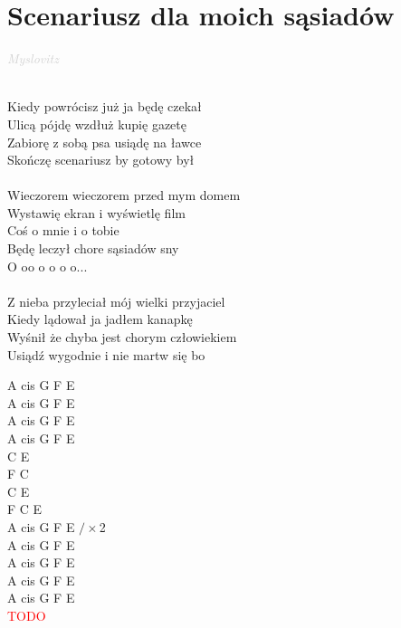 \documentclass[a5paper, 10pt]{book}
\begin{document}
\section{Scenariusz dla moich sąsiadów}\textcolor{lightgray}{\textit{Myslovitz}}\\~\\
\begin{minipage}[t]{0.8\textwidth}
  Kiedy powrócisz już ja będę czekał\\
  Ulicą pójdę wzdłuż kupię gazetę\\
  Zabiorę z sobą psa usiądę na ławce\\
  Skończę scenariusz by gotowy był\\
  \\
  \hspace*{5mm}Wieczorem wieczorem przed mym domem\\
  \hspace*{5mm}Wystawię ekran i wyświetlę film\\
  \hspace*{5mm}Coś o mnie i o tobie\\
  \hspace*{5mm}Będę leczył chore sąsiadów sny\\

  \hspace*{8mm}O oo o o o o...\\
  \\
  Z nieba przyleciał mój wielki przyjaciel\\
  Kiedy lądował ja jadłem kanapkę\\
  Wyśnił że chyba jest chorym człowiekiem\\
  Usiądź wygodnie i nie martw się bo\\
\end{minipage}
\begin{minipage}[t]{0.2\textwidth}
  A cis G F E\\
  A cis G F E\\
  A cis G F E\\
  A cis G F E\\

  C E\\
  F C\\
  C E\\
  F C E\\

  A cis G F E $/ \times$2\\

  A cis G F E\\
  A cis G F E\\
  A cis G F E\\
  A cis G F E\\
  \textcolor{red}{TODO}\\

\end{minipage}
\end{document}
